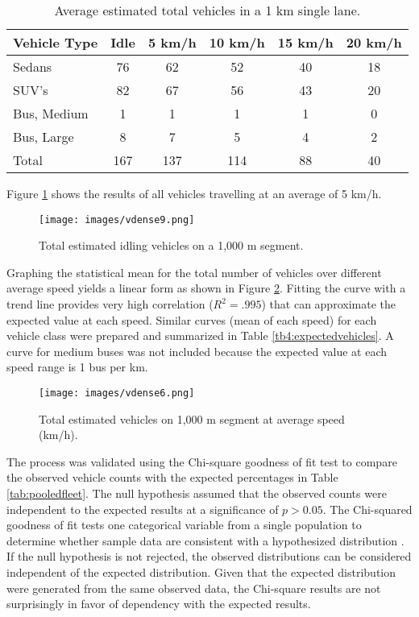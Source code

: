 \begin{table}[H]
\centering
\caption{Average estimated total vehicles in a 1 km single lane.}
\label{tab:meanvehdensity}
\begin{tabular}{@{}lccccc@{}}
\toprule
\textbf{Vehicle Type} & \textbf{Idle} & \textbf{5 km/h} & \textbf{10 km/h} & \textbf{15 km/h} & \textbf{20 km/h} \\ \midrule
Sedans & 76 & 62 & 52 & 40 & 18 \\
SUV's & 82 & 67 & 56 & 43 & 20 \\
Bus, Medium & 1 & 1 & 1 & 1 & 0 \\
Bus, Large & 8 & 7 & 5 & 4 & 2 \\
Total & 167 & 137 & 114 & 88 & 40 \\ \bottomrule
\end{tabular}
\end{table}

Figure \ref{fig6:estimatedobs} shows the results of all vehicles travelling at an average of 5 km/h.
 
%
\begin{figure}[H]
\texttt{[image: images/vdense9.png]} 
\caption{Total estimated idling vehicles on a 1,000 m segment.}
\label{fig6:estimatedobs}
\end{figure}
%

Graphing the statistical mean for the total number of vehicles over different average speed yields a linear form as shown in Figure \ref{fig9:estimateavemix}.  Fitting the curve with a trend line provides very high correlation ($R^{2} = .995$) that can approximate the expected value at each speed.  Similar curves (mean of each speed) for each vehicle class were prepared and summarized in Table \ref{tb4:expectedvehicles}.  A curve for medium buses was not included because the expected value at each speed range is 1 bus per km.

%
\begin{figure}[H]
\texttt{[image: images/vdense6.png]}
\caption{Total estimated vehicles on 1,000 m segment at average speed (km/h).}
\label{fig9:estimateavemix}
\end{figure}
% 

The process was validated using the Chi-square goodness of fit test to compare the observed vehicle counts with the expected percentages in Table \ref{tab:pooledfleet}. The null hypothesis assumed that the observed counts were independent to the expected results at a significance of $p > 0.05$. The Chi-squared goodness of fit tests one categorical variable from a single population to determine whether sample data are consistent with a hypothesized distribution \citep{Agresti2007}. If the null hypothesis is not rejected, the observed distributions can be considered independent of the expected distribution. Given that the expected distribution were generated from the same observed data, the Chi-square results are not surprisingly in favor of dependency with the expected results.

